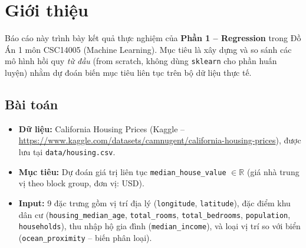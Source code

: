 \documentclass[12pt, a4paper]{article}
\begin{document}
\section{Giới thiệu}
\label{sec:intro}

Báo cáo này trình bày kết quả thực nghiệm của \textbf{Phần 1 -- Regression} trong Đồ Án 1
môn CSC14005 (Machine Learning). Mục tiêu là xây dựng và so sánh các mô hình hồi quy
\emph{từ đầu} (from scratch, không dùng \texttt{sklearn} cho phần huấn luyện) nhằm dự đoán
biến mục tiêu liên tục trên bộ dữ liệu thực tế.

\subsection{Bài toán}
\begin{itemize}
  \item \textbf{Dữ liệu:} California Housing Prices (Kaggle -- \url{https://www.kaggle.com/datasets/camnugent/california-housing-prices}), được lưu tại \texttt{data/housing.csv}.
  \item \textbf{Mục tiêu:} Dự đoán giá trị liên tục \texttt{median\_house\_value} $\in \mathbb{R}$ (giá nhà trung vị theo block group, đơn vị: USD).
  \item \textbf{Input:} 9 đặc trưng gồm vị trí địa lý (\texttt{longitude}, \texttt{latitude}), đặc điểm khu dân cư (\texttt{housing\_median\_age}, \texttt{total\_rooms}, \texttt{total\_bedrooms}, \texttt{population}, \texttt{households}), thu nhập hộ gia đình (\texttt{median\_income}), và loại vị trí so với biển (\texttt{ocean\_proximity} -- biến phân loại).
\end{itemize}
\end{document}
